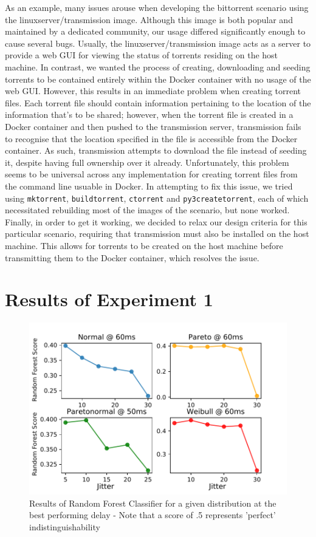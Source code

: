 \documentclass[msc,deptreport, cs]{infthesis} %
\begin{document}
As an example, many issues arouse when developing the bittorrent scenario using the linuxserver/transmission image. Although this image is both popular and maintained by a dedicated community, our usage differed significantly enough to cause several bugs. Usually, the linuxserver/transmission image acts as a server to provide a web GUI for viewing the status of torrents residing on the host machine. In contrast, we wanted the process of creating, downloading and seeding torrents to be contained entirely within the Docker container with no usage of the web GUI. However, this results in an immediate problem when creating torrent files. Each torrent file should contain information pertaining to the location of the information that's to be shared; however, when the torrent file is created in a Docker container and then pushed to the transmission server, transmission fails to recognise that the location specified in the file is accessible from the Docker container. As such, transmission attempts to download the file instead of seeding it, despite having full ownership over it already. Unfortunately, this problem seems to be universal across any implementation for creating torrent files from the command line usuable in Docker. In attempting to fix this issue, we tried using \texttt{mktorrent}, \texttt{buildtorrent}, \texttt{ctorrent} and \texttt{py3createtorrent}, each of which necessitated rebuilding most of the images of the scenario, but none worked. Finally, in order to get it working, we decided to relax our design criteria for this particular scenario, requiring that transmission must also be installed on the host machine. This allows for torrents to be created on the host machine before transmitting them to the Docker container, which resolves the issue.




\section{Results of Experiment 1}
\label{sec:exp1_res}
\vspace{-5mm}
\begin{figure}[hb!]
\captionsetup{justification=centering}
\centering
\includegraphics[width=120mm]{rf_results_with_label.pdf}
\caption{Results of Random Forest Classifier for a given distribution at the best performing delay - Note that a score of .5 represents 'perfect' indistinguishability}
\label{fig:rf_graph}
\end{figure}
\end{document}
